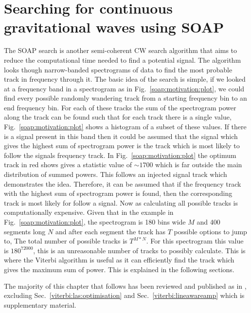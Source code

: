 \chapter{\label{soap}Searching for continuous gravitational waves using SOAP}

The SOAP search is another semi-coherent \ac{CW} search algorithm that aims to reduce the computational time needed to find a potential signal. 
The algorithm looks though narrow-banded spectrograms of data to find the most probable track in frequency through it.
The basic idea of the search is simple, if we looked at a frequency band in a spectrogram as in Fig.~\ref{soap:motivation:plot}, we could find every possible randomly wandering track from a starting frequency bin to an end frequency bin. For each of these tracks the sum of the spectrogram power along the track can be found such that for each track there is a single value, Fig.~\ref{soap:motivation:plot} shows a histogram of a subset of these values. If there is a signal present in this band then it could be assumed that the signal which gives the highest sum of spectrogram power is the track which is most likely to follow the signals frequency track. 
In Fig.~\ref{soap:motivation:plot} the optimum track in red shows gives a statistic value of $\sim 1700$ which is far outside the main distribution of summed powers. 
This follows an injected signal track which demonstrates the idea. 
Therefore, it can be assumed that if the frequency track with the highest sum of spectrogram power is found, then the corresponding track is most likely for follow a signal. 
Now as calculating all possible tracks is computationally expensive. Given that in the example in Fig.~\ref{soap:motivation:plot}, the spectrogram is 180 bins wide $M$ and 400 segments long $N$ and after each segment the track has $T$ possible options to jump to, The total number of possible tracks is $T^{M*N}$. For this spectrogram this value is $180^{72000}$, this is an unreasonable number of tracks to possibly calculate. This is where the Viterbi algorithm \citep{viterbi1967ErrorBounds} is useful as it can efficiently find the track which gives the maximum sum of power. This is explained in the following sections.

The majority of this chapter that follows has been reviewed and published as in \citep{bayley2019GeneralizedApplication}, excluding Sec.~\ref{viterbi:las:optimisation} and Sec.~\ref{viterbi:lineawareamp} which is supplementary material.


